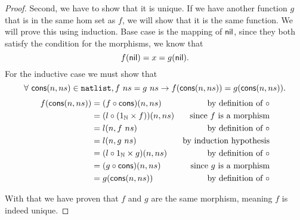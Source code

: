 \begin{solution}
\begin{proof}
			Second, we have to show that it is unique.
			If we have another function $g$ that is in the same hom set as $f$, we will show that it is the same function.
			We will prove this using induction.
			Base case is the mapping of $\mathsf{nil}$, since they both satisfy the condition for the morphisms, we know that
			\[
				f ( \mathsf{nil} ) = x = g ( \mathsf{nil} ).
			\]
			For the inductive case we must show that
			\[
				\forall\ \mathsf{cons} (n, ns) \in \texttt{natlist},
				f\ ns = g\ ns \to f (\mathsf{cons} (n, ns)) = g (\mathsf{cons} (n, ns)).
			\]
			\begin{align*}
				f (\cons (n, ns)) & = (f \circ \cons) (n, ns)           & \text{by definition of $\circ$} \\
				                          & = (l \circ (1_\NN \times f)) (n, ns) & \text{since $f$ is a morphism}  \\
				                          & = l (n, f\ ns)                              & \text{by definition of $\circ$} \\
				                          & = l (n, g\ ns)                              & \text{by induction hypothesis}  \\
				                          & = (l \circ 1_\NN \times g) (n, ns)   & \text{by definition of $\circ$} \\
				                          & = (g \circ \cons) (n, ns)           & \text{since $g$ is a morphism}  \\
				                          & = g (\cons (n, ns))                 & \text{by definition of $\circ$}
			\end{align*}

      With that we have proven that $f$ and $g$ are the same morphism, meaning $f$ is indeed unique.
		\end{proof}
\end{solution}

